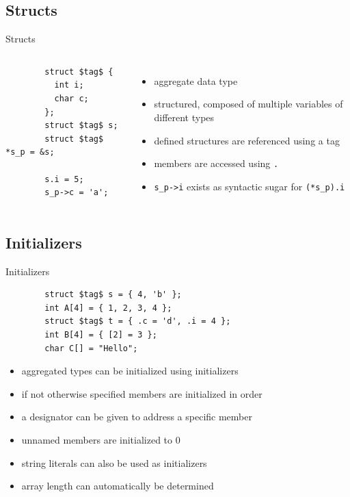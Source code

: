 \documentclass[english,compress]{beamer}
\begin{document}
\subsection{Structs}
\begin{frame}[fragile]{Structs}
	\begin{columns}
	\begin{lstlisting}
		struct $tag$ {
		  int i;
		  char c;
		};
		struct $tag$ s;
		struct $tag$ *s_p = &s;

		s.i = 5;
		s_p->c = 'a';
	\end{lstlisting}
	\begin{itemize}
		\item aggregate data type
		\item structured, composed of multiple variables of different types
		\item defined structures are referenced using a tag
		\item members are accessed using \lstinline|.|
		\item \lstinline|s_p->i| exists as syntactic sugar for
			\lstinline|(*s_p).i|
	\end{itemize}
	\end{columns}
\end{frame}

\subsection{Initializers}
\begin{frame}[fragile]{Initializers}
	\begin{lstlisting}
		struct $tag$ s = { 4, 'b' };
		int A[4] = { 1, 2, 3, 4 };
		struct $tag$ t = { .c = 'd', .i = 4 };
		int B[4] = { [2] = 3 };
		char C[] = "Hello";
	\end{lstlisting}
	\begin{itemize}
		\item aggregated types can be initialized using initializers
		\item if not otherwise specified members are initialized in order
		\item a designator can be given to address a specific member
		\item unnamed members are initialized to 0
		\item string literals can also be used as initializers
		\item array length can automatically be determined
	\end{itemize}
\end{frame}
\end{document}
